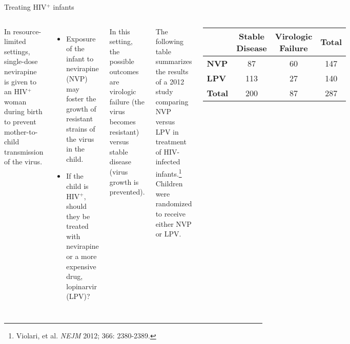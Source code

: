 \documentclass[
  ignorenonframetext,
  aspectratio=169]{beamer}
\newcommand{\columnsbegin}{\begin{columns}}
\newcommand{\columnsend}{\end{columns}}
\begin{document}
\begin{frame}{Treating HIV\(^{+}\) infants}
\protect\hypertarget{treating-hiv-infants}{}
\columnsbegin


\footnotesize

In resource-limited settings, single-dose nevirapine is given to an
HIV\(^{+}\) woman during birth to prevent mother-to-child transmission
of the virus.

\begin{itemize}
\item
  Exposure of the infant to nevirapine (NVP) may foster the growth of
  resistant strains of the virus in the child.
\item
  If the child is HIV\(^+\), should they be treated with nevirapine or a
  more expensive drug, lopinarvir (LPV)?
\end{itemize}

In this setting, the possible outcomes are virologic failure (the virus
becomes resistant) versus stable disease (virus growth is prevented).


\footnotesize

The following table summarizes the results of a 2012 study comparing NVP
versus LPV in treatment of HIV-infected
infants.\footnote{Violari, et al. \textit{NEJM} 2012; 366: 2380-2389.}
Children were randomized to receive either NVP or LPV.

\begin{center}
\begin{tabular}{l|cc|c} 
   & \textbf{Stable Disease} & \textbf{Virologic Failure} & \textbf{Total}\\ \hline
  \textbf{NVP} & 87 & 60 & 147  \\
  \textbf{LPV} & 113 & 27 & 140 \\ \hline
  \textbf{Total} & 200 & 87 & 287  \\ 
\end{tabular}\\
\end{center}

\columnsend
\end{frame}
\end{document}
